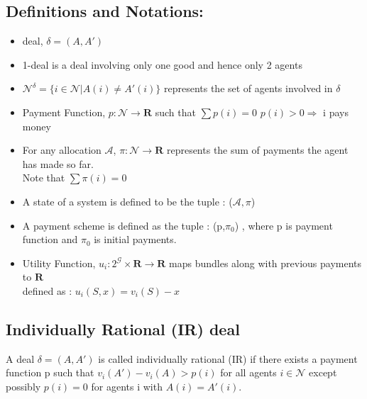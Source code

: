 \documentclass{article}
\begin{document}
\subsection{Definitions and Notations:}
\begin{itemize}
    \item deal, $\delta = (A,A')$
    \item 1-deal is a deal involving only one good and hence only 2 agents
    \item $\mathcal{N}^{\delta}=\{i \in \mathcal{N} | A(i) \neq A'(i) \}$ represents the set of agents involved in $\delta$
    \item Payment Function, $p:\mathcal{N} \to \mathbf{R} $ such that $\sum{p(i)}=0$
    $p(i)>0 \Rightarrow $ i pays money
    \item For any allocation $\mathcal{A}$, $\pi : \mathcal{N} \to \mathbf{R}$ represents the sum of payments the agent has made so far.\\
    Note that $\sum \pi (i) = 0$
    \item A state of a system is defined to be the tuple : ($\mathcal{A},\pi$)
    \item A payment scheme is defined as the tuple : (p,$\pi_{0}$) , where p is payment function and $\pi_{0}$ is initial payments.
    \item Utility Function, $u_{i}:2^{\mathcal{G}}\times \mathbf{R} \to \mathbf{R}$ maps bundles along with previous payments to $\mathbf{R}$\\
    defined as : $u_{i}(S,x)=v_{i}(S)-x$
\end{itemize}
\subsection{Individually Rational (IR) deal}
A deal $\delta = (A,A')$ is called individually rational (IR) if there exists a payment function p such that $v_{i}(A') - v_{i}(A) > p(i)$ for all agents $i \in \mathcal{N}$ except possibly $p(i) = 0$ for agents i with $A(i) = A'(i)$.
\end{document}
